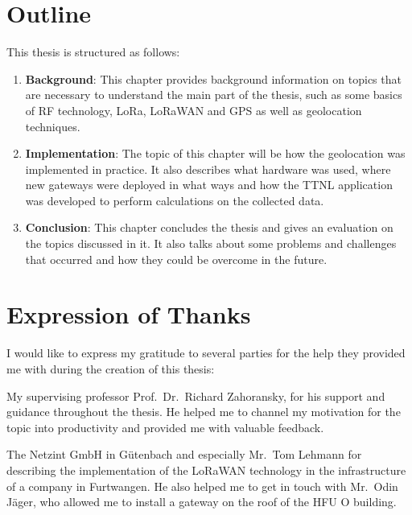 
\section{Outline}

This thesis is structured as follows:

\begin{enumerate}
      \item \textbf{Background}:
            This chapter provides background information on topics that are necessary to understand the main part of the thesis, such as some basics of \ac{RF} technology, \ac{LoRa}, \ac{LoRaWAN} and \ac{GPS} as well as geolocation techniques.
      \item \textbf{Implementation}:
            The topic of this chapter will be how the geolocation was implemented in practice.
            It also describes what hardware was used, where new gateways were deployed in what ways and how the \ac{TTNL} application was developed to perform calculations on the collected data.
      \item \textbf{Conclusion}:
            This chapter concludes the thesis and gives an evaluation on the topics discussed in it.
            It also talks about some problems and challenges that occurred and how they could be overcome in the future.
\end{enumerate}


\section{Expression of Thanks}\label{sec:expression-of-thanks}

I would like to express my gratitude to several parties for the help they provided me with during the creation of this thesis:

My supervising professor Prof.\ Dr.\ Richard Zahoransky, for his support and guidance throughout the thesis.
He helped me to channel my motivation for the topic into productivity and provided me with valuable feedback.

The Netzint GmbH in Gütenbach and especially Mr.\ Tom Lehmann for describing the implementation of the \ac{LoRaWAN} technology in the infrastructure of a company in Furtwangen.
He also helped me to get in touch with Mr.\ Odin Jäger, who allowed me to install a gateway on the roof of the \ac{HFU} O building.

